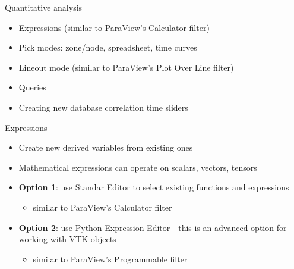 \begin{comment}
  http://www.vtk.org/download - Download VTK textbook examples and data - PineRoot.tgz
  http://www.vtk.org/files/release/7.0/VTKLargeData-7.0.0.zip
  http://www.visitusers.org/index.php?title=Short_Tutorial
\end{comment}

\begin{frame}{Quantitative analysis}{}
  \begin{itemize}\setlength{\itemsep}{3mm}
  \item Expressions (similar to ParaView's Calculator filter)
  \item Pick modes: zone/node, spreadsheet, time curves
  \item Lineout mode (similar to ParaView's Plot Over Line filter)
  \item Queries
  \item Creating new database correlation time sliders
  \end{itemize}
\end{frame}

\begin{frame}{Expressions}
  \begin{itemize}\setlength{\itemsep}{5mm}
  \item Create new derived variables from existing ones
  \item Mathematical expressions can operate on scalars, vectors, tensors
  \item {\bf Option 1}: use Standar Editor to select existing functions and expressions
    \begin{itemize}
    \item similar to ParaView's Calculator filter
    \end{itemize}
  \item {\bf Option 2}: use Python Expression Editor - this is an advanced option for working with VTK
    objects
    \begin{itemize}
    \item similar to ParaView's Programmable filter
    \end{itemize}
  \end{itemize}
\end{frame}

